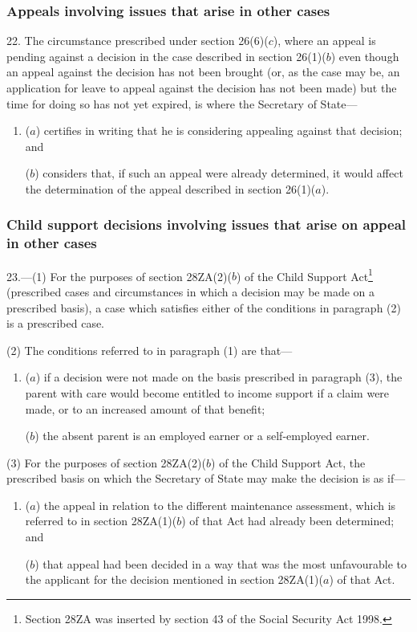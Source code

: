 \documentclass[12pt,a4paper]{article}
\begin{document}
\subsubsection[22. Appeals involving issues that arise in other cases]{Appeals involving issues that arise in other cases}

22.  The circumstance prescribed under section 26(6)($c$), where an appeal is pending against a decision in the case described in section 26(1)($b$) even though an appeal against the decision has not been brought (or, as the case may be, an application for leave to appeal against the decision has not been made) but the time for doing so has not yet expired, is where the Secretary of State—
\begin{enumerate}\item[]
($a$) certifies in writing that he is considering appealing against that decision; and

($b$) considers that, if such an appeal were already determined, it would affect the determination of the appeal described in section 26(1)($a$).
\end{enumerate}

\subsubsection[23. Child support decisions involving issues that arise on appeal in other cases]{Child support decisions involving issues that arise on appeal in other cases}

23.—(1) For the purposes of section 28ZA(2)($b$) of the Child Support Act\footnote{\frenchspacing Section 28ZA was inserted by section 43 of the Social Security Act 1998.} (prescribed cases and circumstances in which a decision may be made on a prescribed basis), a case which satisfies either of the conditions in paragraph (2) is a prescribed case.

(2) The conditions referred to in paragraph (1) are that—
\begin{enumerate}\item[]
($a$) if a decision were not made on the basis prescribed in paragraph (3), the parent with care would become entitled to income support if a claim were made, or to an increased amount of that benefit;

($b$) the absent parent is an employed earner or a self-employed earner.
\end{enumerate}

(3) For the purposes of section 28ZA(2)($b$) of the Child Support Act, the prescribed basis on which the Secretary of State may make the decision is as if—
\begin{enumerate}\item[]
($a$) the appeal in relation to the different maintenance assessment, which is referred to in section 28ZA(1)($b$) of that Act had already been determined; and

($b$) that appeal had been decided in a way that was the most unfavourable to the applicant for the decision mentioned in section 28ZA(1)($a$) of that Act.
\end{enumerate}
\end{document}
